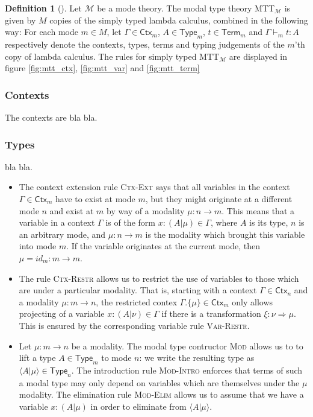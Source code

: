\documentclass{scrartcl}
\theoremstyle{definition}
\newtheorem{definition}{Definition}
\theoremstyle{plain}
\begin{document}
\begin{definition}[{\cite[following Chapter 6.2]{gratzer2023syntax}}]
  Let $\mathcal{M}$ be a mode theory. The modal type theory
  MTT${}_{\mathcal{M}}$ is given by $M$ copies of
  the simply typed lambda calculus, combined in the following way:
  For each mode $m \in M$, let $\Gamma\in\textsf{Ctx}_m$, $A \in
  \textsf{Type}_m$, $t \in \textsf{Term}_m$ and
  $\Gamma \vdash_m t : A$ respectively denote the contexts, types, terms and
  typing judgements of the $m$'th copy of lambda calculus. The rules for
  simply typed MTT${}_{\mathcal{M}}$ are displayed in figure \ref{fig:mtt_ctx},
  \ref{fig:mtt_var} and \ref{fig:mtt_term}
  \subsubsection*{Contexts}
  The contexts are bla bla.
  \subsubsection*{Types}
  bla bla.

  \begin{itemize}
  \item The context extension rule \textsc{Ctx-Ext} says that all variables in
    the context $\Gamma \in \textsf{Ctx}_m$ have to exist at mode $m$, but
    they might
    originate at a different mode $n$ and exist at $m$ by way of a modality
    $\mu : n \to m$. This means that a variable in a context $\Gamma$ is of the
    form $x : (A | \mu) \in \Gamma$, where $A$ is its type, $n$ is an arbitrary
    mode, and $\mu : n \to m$ is the modality which
    brought this variable into mode $m$. If the variable originates at the current
    mode, then $\mu = id_m : m \to m$.
  \item The rule \textsc{Ctx-Restr} allows us to restrict the use of variables
    to those which are under a particular modality. That is, starting with a
    context $\Gamma \in \textsf{Ctx}_n$ and a modality $\mu : m \to n$, the
    restricted contex $\Gamma.\{\mu\}\in\textsf{Ctx}_m$ only allows projecting of a variable $x :
    (A | \nu) \in \Gamma$ if there is a transformation $\xi : \nu \Rightarrow
    \mu$. This is ensured by the corresponding variable rule \textsc{Var-Restr}.
  \item Let $\mu : m \to n$ be a modality. The modal type contructor
    \textsc{Mod} allows us to to lift a type $A \in
    \textsf{Type}_m$ to mode $n$: we write the resulting type as $\langle A | \mu \rangle \in
    \textsf{Type}_n$. The introduction rule \textsc{Mod-Intro} enforces that
    terms of such a modal type may only depend on variables
    which are themselves under the $\mu$ modality. The elimination rule \textsc{Mod-Elim} allows
    us to assume that we have a variable $x : (A|\mu)$ in order to eliminate
    from $\langle A | \mu \rangle$.

  \end{itemize}
\end{definition}
\end{document}

